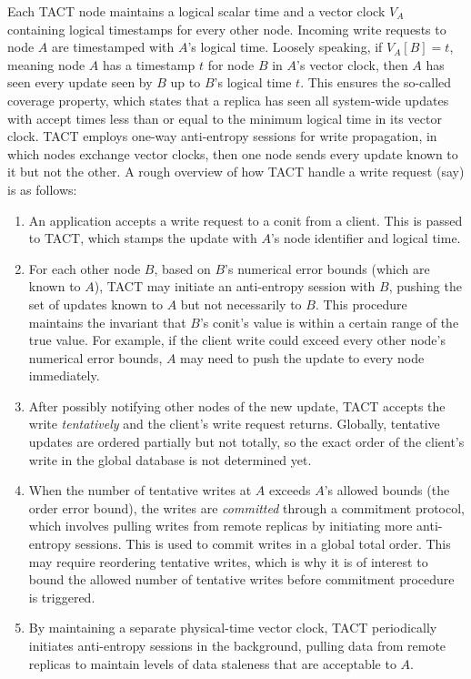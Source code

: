 Each TACT node maintains a logical scalar time and a vector clock $V_A$
containing logical timestamps for every other node. Incoming write requests to
node $A$ are timestamped with $A$'s logical time. Loosely speaking, if
$V_A[B]=t$, meaning node $A$ has a timestamp $t$ for node $B$ in $A$'s vector
clock, then $A$ has seen every update seen by $B$ up to $B$'s logical time $t$.
This ensures the so-called coverage property, which states that a replica has
seen all system-wide updates with accept times less than or equal to the minimum
logical time in its vector clock. TACT employs one-way anti-entropy sessions for
write propagation, in which nodes exchange vector clocks, then one node sends
every update known to it but not the other. A rough overview of how TACT handle
a write request (say) is as follows:
\begin{enumerate}
   \item An application accepts a write request to a conit from a client. This
     is passed to TACT, which stamps the update with $A$'s node identifier and
     logical time.
   \item For each other node $B$, based on $B$'s numerical error bounds (which
     are known to $A$), TACT may initiate an anti-entropy session with $B$,
     pushing the set of updates known to $A$ but not necessarily to $B$. This
     procedure maintains the invariant that $B$'s conit's value is within a
     certain range of the true value. For example, if the client write could
     exceed every other node's numerical error bounds, $A$ may need to push the
     update to every node immediately.
   \item After possibly notifying other nodes of the new update, TACT accepts
     the write \emph{tentatively} and the client's write request returns.
     Globally, tentative updates are ordered partially but not totally, so the
     exact order of the client's write in the global database is not determined
     yet.
   \item When the number of tentative writes at $A$ exceeds $A$'s allowed bounds
     (the order error bound), the writes are \emph{committed} through a
     commitment protocol, which involves pulling writes from remote replicas by
     initiating more anti-entropy sessions. This is used to commit writes in a
     global total order. This may require reordering tentative writes, which is
     why it is of interest to bound the allowed number of tentative writes
     before commitment procedure is triggered.
   \item By maintaining a separate physical-time vector clock, TACT periodically
     initiates anti-entropy sessions in the background, pulling data from remote
     replicas to maintain levels of data staleness that are acceptable to $A$.
\end{enumerate}

